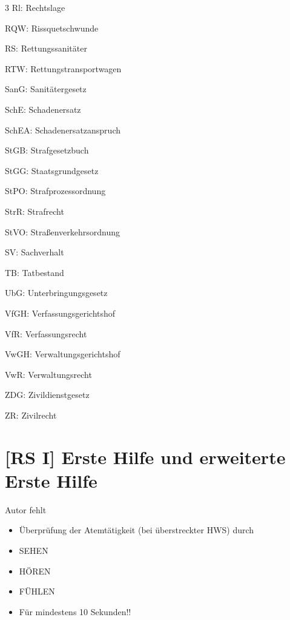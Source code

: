 \documentclass{article}
\begin{document}
\begin{multicols}{3}
Rl:  Rechtslage

RQW:  Rissquetschwunde

RS:  Rettungssanit\"ater

RTW:  Rettungstransportwagen

SanG:  Sanit\"atergesetz

SchE:  Schadenersatz

SchEA:  Schadenersatzanspruch

StGB:  Strafgesetzbuch

StGG:  Staatsgrundgesetz

StPO:  Strafprozessordnung

StrR:  Strafrecht

StVO:  Stra{\ss}enverkehrsordnung

SV:  Sachverhalt

TB:  Tatbestand

UbG:  Unterbringungsgesetz

VfGH:  Verfassungsgerichtshof

VfR:  Verfassungsrecht

VwGH:  Verwaltungsgerichtshof

VwR:  Verwaltungsrecht

ZDG:  Zivildienstgesetz

ZR:  Zivilrecht

\end{multicols}
\section{[RS I] Erste Hilfe und erweiterte Erste Hilfe}
Autor fehlt

\begin{itemize}
\item \"Uberpr\"ufung der Atemt\"atigkeit (bei  \"uberstreckter HWS)
durch

\end{itemize}
\begin{itemize}
\item SEHEN 

\item H\"OREN

\item F\"UHLEN

\item F\"ur mindestens 10  Sekunden!! 

\end{itemize}
\end{document}
